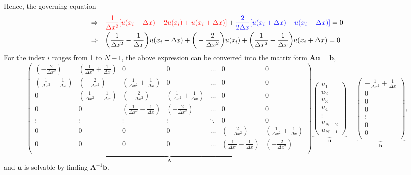 \documentclass[a4paper]{article}
\begin{document}
\begin{tcolorbox}[title = Numerical Solution Procedure, breakable]
Hence, the governing equation
\begin{align*}
    \Rightarrow \quad 
    & {\color{red} \frac{1}{\Delta x^2} [u(x_i-\Delta x) - 2u(x_i) + u(x_i+\Delta x)]} 
    + {\color{blue} \frac{2}{2\Delta x} [u(x_i+\Delta x) - u(x_i-\Delta x)]} = 0 \\
    \Rightarrow \quad 
    & \bigg(\frac{1}{\Delta x^2} - \frac{1}{\Delta x} \bigg) u(x_i-\Delta x) + \bigg(-\frac{2}{\Delta x^2}\bigg)u(x_i) + \bigg(\frac{1}{\Delta x^2}+\frac{1}{\Delta x}\bigg) u(x_i+\Delta x) = 0
\end{align*}
For the index $i$ ranges from 1 to $N-1$, the above expression can be converted into the matrix form $\mathbf{A} \mathbf{u} = \mathbf{b}$,
\[
    \underbrace{\begin{pmatrix}
        (-\frac{2}{\Delta x^2}) & (\frac{1}{\Delta x^2} + \frac{1}{\Delta x}) & 0 & 0 & \hdots & 0 & 0 \\
        (\frac{1}{\Delta x^2} - \frac{1}{\Delta x}) & (-\frac{2}{\Delta x^2}) & (\frac{1}{\Delta x^2} + \frac{1}{\Delta x}) & 0 & \hdots & 0 & 0 \\
        0 & (\frac{1}{\Delta x^2} - \frac{1}{\Delta x}) & (-\frac{2}{\Delta x^2}) & (\frac{1}{\Delta x^2} + \frac{1}{\Delta x}) & \hdots & 0 & 0 \\
        0 & 0 & (\frac{1}{\Delta x^2} - \frac{1}{\Delta x}) & (-\frac{2}{\Delta x^2}) & \hdots & 0 & 0 \\
        \vdots & \vdots & \vdots & \vdots & \ddots & 0 & 0 \\
        0 & 0 & 0 & 0 & \hdots & (-\frac{2}{\Delta x^2}) & (\frac{1}{\Delta x^2} + \frac{1}{\Delta x}) \\
        0 & 0 & 0 & 0 & \hdots & (\frac{1}{\Delta x^2} - \frac{1}{\Delta x}) & (-\frac{2}{\Delta x^2}) \\
    \end{pmatrix}}_{\mathbf{A}}
    \underbrace{\begin{pmatrix}
        u_1 \\
        u_2 \\
        u_3 \\
        u_4 \\
        \vdots \\
        u_{N-2} \\
        u_{N-1}
    \end{pmatrix}}_{\mathbf{u}}
    =
    \underbrace{\begin{pmatrix}
        -\frac{1}{\Delta x^2} + \frac{1}{\Delta x} \\
        0 \\
        0 \\
        0 \\
        \vdots \\
        0 \\
        0\\
    \end{pmatrix}}_{\mathbf{b}},
\]
and $\mathbf{u}$ is solvable by finding $\mathbf{A}^{-1}\mathbf{b}$.
\end{tcolorbox}
\end{document}
